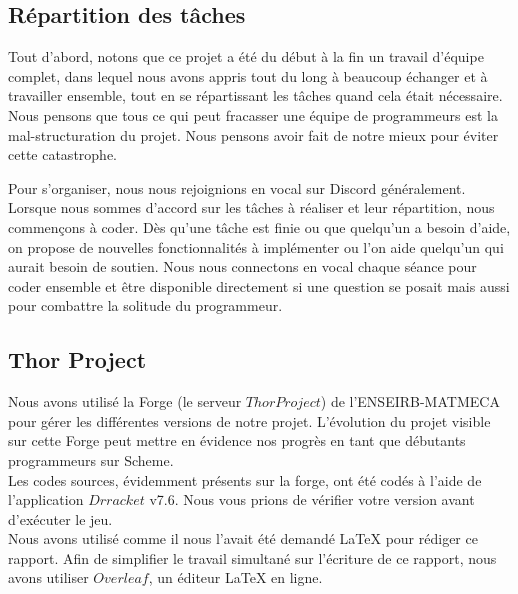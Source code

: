\documentclass{article}
\begin{document}
    \subsection{Répartition des tâches}
    Tout d'abord, notons que ce projet a été du début à la fin un travail d'équipe complet, dans lequel nous avons appris tout du long à beaucoup échanger et à travailler ensemble, tout en se répartissant les tâches quand cela était nécessaire. Nous pensons que tous ce qui peut fracasser une équipe de programmeurs est la mal-structuration du projet. Nous pensons avoir fait de notre mieux pour éviter cette catastrophe.
    
    Pour s'organiser, nous nous rejoignions en vocal sur Discord généralement. Lorsque nous sommes d'accord sur les tâches à réaliser et leur répartition, nous commençons à coder. Dès qu'une tâche est finie ou que quelqu'un a besoin d'aide, on propose de nouvelles fonctionnalités à implémenter ou l'on aide quelqu'un qui aurait besoin de soutien.
    Nous nous connectons en vocal chaque séance pour coder ensemble et être disponible directement si une question se posait mais aussi pour combattre la solitude du programmeur.
    
    \subsection{Thor Project}
    Nous avons utilisé la Forge (le serveur $Thor Project$) de l'ENSEIRB-MATMECA pour gérer les différentes versions de notre projet. L'évolution du projet visible sur cette Forge peut mettre en évidence nos progrès en tant que débutants programmeurs sur Scheme.\\
    Les codes sources, évidemment présents sur la forge, ont été codés à l'aide de l'application $Drracket$ v7.6. Nous vous prions de vérifier votre version avant d'exécuter le jeu.\\
    Nous avons utilisé comme il nous l'avait été demandé LaTeX pour rédiger ce rapport. Afin de simplifier le travail simultané sur l'écriture de ce rapport, nous avons utiliser $Overleaf$, un éditeur LaTeX en ligne.\\
\end{document}
